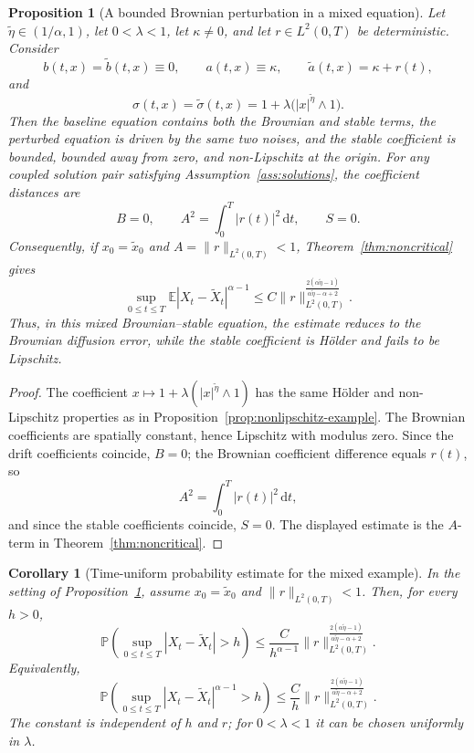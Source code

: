 \documentclass[11pt]{article}
\newtheorem{proposition}[theorem]{Proposition}
\newtheorem{corollary}[theorem]{Corollary}
\newcommand{\E}{\mathbb{E}}
\newcommand{\1}{\mathbf{1}}
\newcommand{\dd}{\,\mathrm{d}}
\newcommand{\wt}{\tilde}
\begin{document}
\begin{proposition}[A bounded Brownian perturbation in a mixed equation]\label{prop:mixed-brownian-error}
Let $\wt\eta\in(1/\alpha,1)$, let $0<\lambda<1$, let $\kappa\ne0$, and let $r\in L^2(0,T)$ be deterministic. Consider
\[
  b(t,x)=\wt b(t,x)\equiv0,
  \qquad
  a(t,x)\equiv\kappa,
  \qquad
  \wt a(t,x)=\kappa+r(t),
\]
and
\[
  \sigma(t,x)=\wt\sigma(t,x)=1+\lambda\bigl(|x|^{\wt\eta}\wedge1\bigr).
\]
Then the baseline equation contains both the Brownian and stable terms, the perturbed equation is driven by the same two noises, and the stable coefficient is bounded, bounded away from zero, and non-Lipschitz at the origin. For any coupled solution pair satisfying Assumption~\ref{ass:solutions}, the coefficient distances are
\[
  B=0,
  \qquad
  A^2=\int_0^T |r(t)|^2\dd t,
  \qquad
  S=0.
\]
Consequently, if $x_0=\wt x_0$ and $A=\|r\|_{L^2(0,T)}<1$, Theorem~\ref{thm:noncritical} gives
\[
  \sup_{0\le t\le T}\E|X_t-\wt X_t|^{\alpha-1}
  \le C\|r\|_{L^2(0,T)}^{\frac{2(\alpha\wt\eta-1)}{\alpha\wt\eta-\alpha+2}}.
\]
Thus, in this mixed Brownian--stable equation, the estimate reduces to the Brownian diffusion error, while the stable coefficient is H\"older and fails to be Lipschitz.
\end{proposition}

\begin{proof}
The coefficient $x\mapsto1+\lambda(|x|^{\wt\eta}\wedge1)$ has the same H\"older and non-Lipschitz properties as in Proposition~\ref{prop:nonlipschitz-example}. The Brownian coefficients are spatially constant, hence Lipschitz with modulus zero. Since the drift coefficients coincide, $B=0$; the Brownian coefficient difference equals $r(t)$, so
\[
  A^2=\int_0^T|r(t)|^2\dd t,
\]
and since the stable coefficients coincide, $S=0$. The displayed estimate is the $A$-term in Theorem~\ref{thm:noncritical}.
\end{proof}

\begin{corollary}[Time-uniform probability estimate for the mixed example]\label{cor:mixed-example-probability}
In the setting of Proposition~\ref{prop:mixed-brownian-error}, assume $x_0=\wt x_0$ and $\|r\|_{L^2(0,T)}<1$. Then, for every $h>0$,
\[
  \mathbb P\left(\sup_{0\le t\le T}|X_t-\wt X_t|>h\right)
  \le
  \frac{C}{h^{\alpha-1}}
  \|r\|_{L^2(0,T)}^{\frac{2(\alpha\wt\eta-1)}{\alpha\wt\eta-\alpha+2}}.
\]
Equivalently,
\[
  \mathbb P\left(\sup_{0\le t\le T}|X_t-\wt X_t|^{\alpha-1}>h\right)
  \le
  \frac{C}{h}
  \|r\|_{L^2(0,T)}^{\frac{2(\alpha\wt\eta-1)}{\alpha\wt\eta-\alpha+2}}.
\]
The constant is independent of $h$ and $r$; for $0<\lambda<1$ it can be chosen uniformly in $\lambda$.
\end{corollary}
\end{document}
